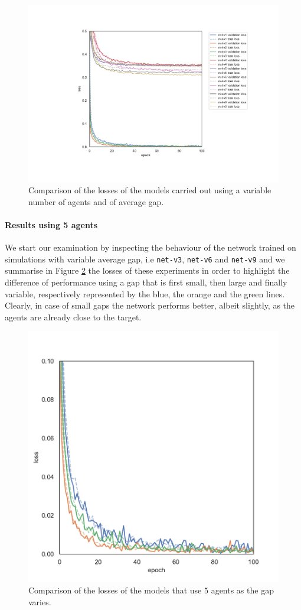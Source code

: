 \begin{figure}[!htb]
	\centering
	\includegraphics[width=.8\textwidth]{contents/images/task2/loss-communication-all@}%
	\caption[Comparison of losses of the second set of experiments.]{Comparison 
		of the losses of the models carried out using a variable number of agents and 
		of average gap.}
	\label{fig:t2lossallt}
\end{figure}

\paragraph*{Results using 5 agents}

We start our examination by inspecting the behaviour of the network trained on 
simulations with variable average gap, i.e \texttt{net-v3}, \texttt{net-v6} and 
\texttt{net-v9} and we summarise in Figure \ref{fig:commlossn5t2} the losses of 
these experiments in order to highlight the difference of performance using a gap 
that is first small, then large and finally variable, respectively represented by the 
blue, the orange and the green lines.
Clearly, in case of small gaps the network performs better, albeit slightly, as the 
agents are already close to the target.

\begin{figure}[!htb]
	\centering
	\includegraphics[width=.5\textwidth]{contents/images/task2/loss-communication-N5}
	\caption[Comparison of the losses of the models that use $5$ 
	agents.]{Comparison of the losses of the models that use $5$ agents as 
	the gap varies.}
	\label{fig:commlossn5t2}
\end{figure}

